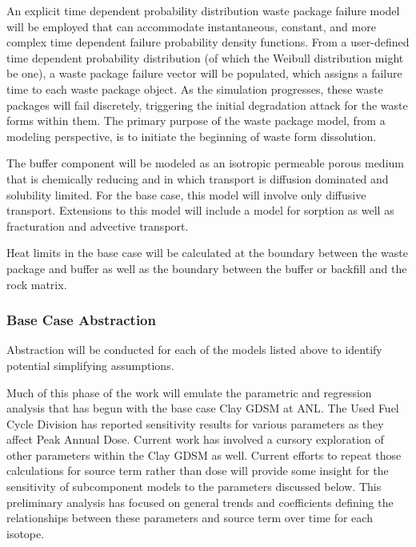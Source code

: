 
      
      An explicit time dependent probability distribution waste package failure 
      model will be employed that can accommodate instantaneous, constant, and 
      more complex time dependent failure probability density functions.
      From a user-defined time dependent probability distribution (of which the 
      Weibull distribution might be one), a waste package failure vector will be 
      populated, which assigns a failure time to each waste package object. As 
      the simulation progresses, these waste packages will fail discretely, 
      triggering the initial degradation attack for the waste forms within them. 
      The primary purpose of the waste package model, from a modeling 
      perspective, is to initiate the beginning of waste form dissolution.

      

      The buffer component will be modeled as an isotropic permeable porous 
      medium that is chemically reducing and in which transport is diffusion 
      dominated  and solubility limited.  For the base case, this model will 
      involve only diffusive transport. Extensions to this model will include a 
      model for sorption as well as fracturation and advective transport.  


      Heat limits in the base case will be calculated at the boundary between 
      the waste package and buffer as well as the boundary between the buffer or  
      backfill and the rock matrix.

\subsubsection{Base Case Abstraction }


  Abstraction will be conducted for each of the models listed above to identify  
  potential simplifying assumptions.  
  
  Much of this phase of the work will emulate the parametric and regression analysis that
has begun with the base case Clay \gls{GDSM} at \gls{ANL}.  
The Used Fuel Cycle Division has reported sensitivity results for various 
parameters as they affect Peak Annual Dose. Current work has involved a cursory  
exploration of other parameters within the Clay \gls{GDSM} as well. Current 
efforts to repeat those calculations for source term rather than 
dose will provide some insight for the sensitivity of subcomponent models to the 
parameters discussed below. This preliminary analysis has focused on general 
trends and coefficients defining the relationships between these 
parameters and source term over time for each isotope. 


